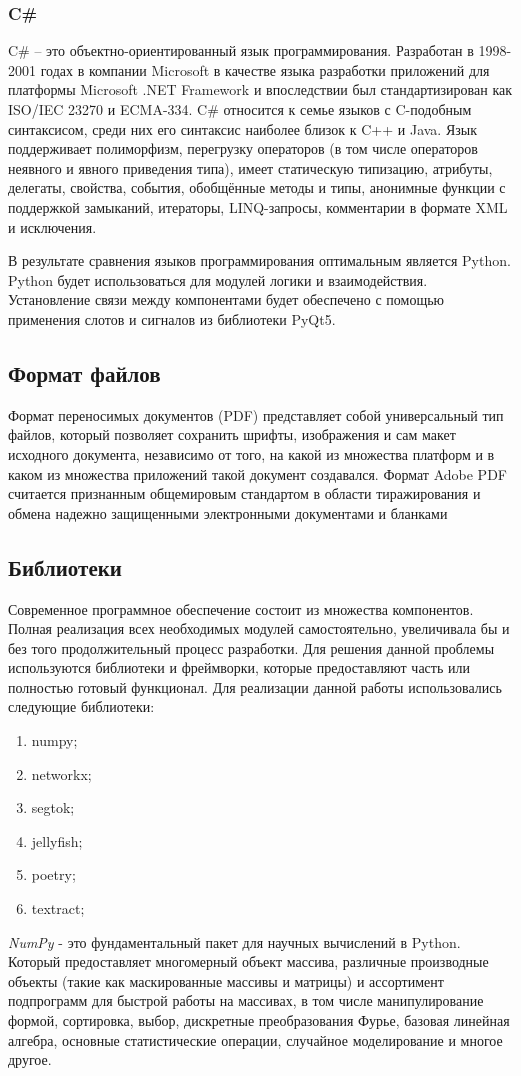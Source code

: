 \subsubsection{C\#}
C\# – это объектно-ориентированный язык программирования. Разработан в 1998-2001 годах в компании Microsoft в качестве языка разработки приложений для платформы Microsoft .NET Framework и впоследствии был стандартизирован как ISO/IEC 23270 и ECMA-334. C\# относится к семье языков с C-подобным синтаксисом, среди них его синтаксис наиболее близок к C++ и Java. 
Язык поддерживает полиморфизм, перегрузку операторов (в том числе операторов неявного и явного приведения типа), имеет статическую типизацию, атрибуты, делегаты, свойства, события, обобщённые методы и типы, анонимные функции с поддержкой замыканий, итераторы, LINQ-запросы,
комментарии в формате XML и исключения.

В результате сравнения языков программирования оптимальным является Python.
Python будет использоваться для модулей логики и взаимодействия.
Установление связи между компонентами будет обеспечено с помощью применения слотов и сигналов из библиотеки PyQt5.

\subsection{Формат файлов}
Формат переносимых документов (PDF) представляет собой универсальный тип файлов, который позволяет сохранить шрифты, изображения и сам макет исходного документа, независимо от того, на какой из множества платформ и в каком из множества приложений такой документ создавался. 
Формат Adobe PDF считается признанным общемировым стандартом в области тиражирования и обмена надежно защищенными электронными документами и бланками \cite{23}


\subsection{Библиотеки}
Современное программное обеспечение состоит из множества компонентов. 
Полная реализация всех необходимых модулей самостоятельно, увеличивала бы и без того продолжительный процесс разработки.
Для решения данной проблемы используются библиотеки и фреймворки, которые предоставляют часть или полностью готовый функционал.
Для реализации данной работы использовались следующие библиотеки:
\begin{enumerate}
	\item numpy;
	\item networkx;
	\item segtok;
	\item jellyfish;
	\item poetry;
	\item textract;
\end{enumerate}
\textit{NumPy} - это фундаментальный пакет для научных вычислений в Python. 
Который предоставляет многомерный объект массива, различные производные объекты (такие как маскированные массивы и матрицы) и ассортимент подпрограмм для быстрой работы на массивах, в том числе манипулирование формой, сортировка, выбор, дискретные преобразования Фурье, базовая линейная алгебра, основные статистические операции, случайное моделирование и многое другое.

